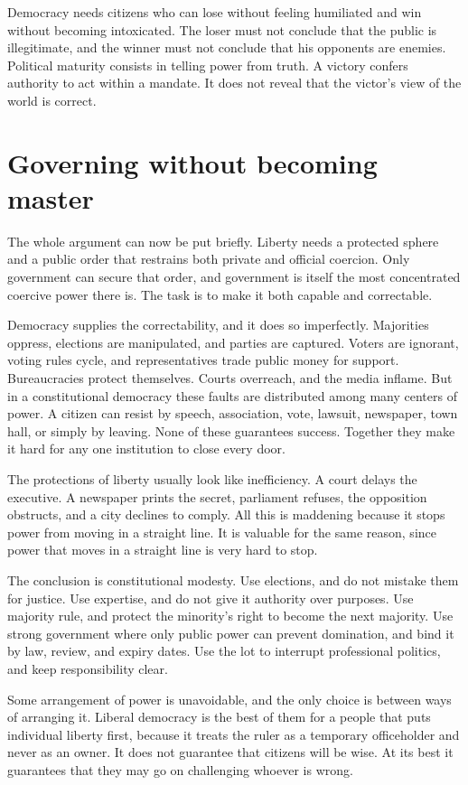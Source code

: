 \documentclass[12pt,a4paper]{book}
\begin{document}
Democracy needs citizens who can lose without feeling humiliated and win without becoming intoxicated. The loser must not conclude that the public is illegitimate, and the winner must not conclude that his opponents are enemies. Political maturity consists in telling power from truth. A victory confers authority to act within a mandate. It does not reveal that the victor's view of the world is correct.

\section{Governing without becoming master}

The whole argument can now be put briefly. Liberty needs a protected sphere and a public order that restrains both private and official coercion. Only government can secure that order, and government is itself the most concentrated coercive power there is. The task is to make it both capable and correctable.

Democracy supplies the correctability, and it does so imperfectly. Majorities oppress, elections are manipulated, and parties are captured. Voters are ignorant, voting rules cycle, and representatives trade public money for support. Bureaucracies protect themselves. Courts overreach, and the media inflame. But in a constitutional democracy these faults are distributed among many centers of power. A citizen can resist by speech, association, vote, lawsuit, newspaper, town hall, or simply by leaving. None of these guarantees success. Together they make it hard for any one institution to close every door.

The protections of liberty usually look like inefficiency. A court delays the executive. A newspaper prints the secret, parliament refuses, the opposition obstructs, and a city declines to comply. All this is maddening because it stops power from moving in a straight line. It is valuable for the same reason, since power that moves in a straight line is very hard to stop.

The conclusion is constitutional modesty. Use elections, and do not mistake them for justice. Use expertise, and do not give it authority over purposes. Use majority rule, and protect the minority's right to become the next majority. Use strong government where only public power can prevent domination, and bind it by law, review, and expiry dates. Use the lot to interrupt professional politics, and keep responsibility clear.

Some arrangement of power is unavoidable, and the only choice is between ways of arranging it. Liberal democracy is the best of them for a people that puts individual liberty first, because it treats the ruler as a temporary officeholder and never as an owner. It does not guarantee that citizens will be wise. At its best it guarantees that they may go on challenging whoever is wrong.
\end{document}
